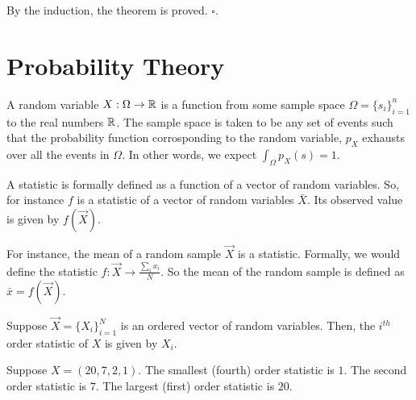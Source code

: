 By the induction, the theorem is proved. $\square$.


\newpage
\section{Probability Theory}

\begin{definition}
A random variable $X: \Omega \to \mathbb{R}$ is a function from some sample space $\Omega = \{s_i\}_{i=1}^n$ to the real numbers $\mathbb{R}$. The sample space is taken to be any set of events such that the probability function corrosponding to the random variable, $p_X$ exhausts over all the events in $\Omega$. In other words, we expect $\int_\Omega p_X(s) = 1$.
\end{definition}

\begin{definition}[Statistic]
A statistic is formally defined as a function of a vector of random variables. So, for instance $f$ is a statistic of a vector of random variables $\bar{X}$. Its observed value is given by $f(\vec{X})$.
\end{definition}

\begin{example}
For instance, the mean of a random sample $\vec{X}$ is a statistic. Formally, we would define the statistic $f : \vec{X} \to \frac{\sum_i x_i}{N}$. So the mean of the random sample is defined as $\bar{x} = f(\vec{X})$.
\end{example}

\begin{definition}
Suppose $\vec{X} = \{X_i\}_{i = 1}^N$ is an ordered vector of random variables. Then, the $i^{th}$ order statistic of $X$ is given by $X_i$.
\end{definition}

\begin{example}
Suppose $X = (20,7,2,1)$. The smallest (fourth) order statistic is $1$. The second order statistic is $7$. The largest (first) order statistic is $20$.
\end{example}

